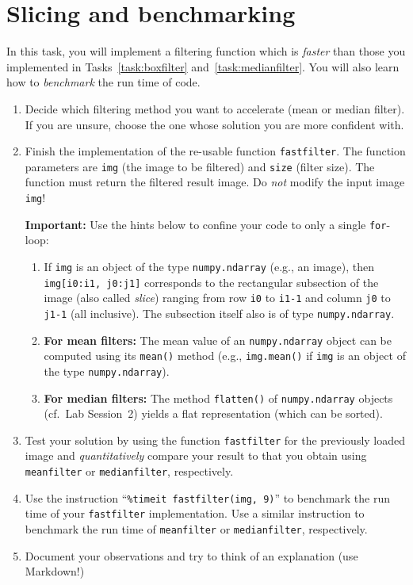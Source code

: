 \documentclass[12pt,a4paper]{article}
\begin{document}
\noindent\begin{minipage}{\textwidth}
\section{Slicing and benchmarking \bonustask}

In this task, you will implement a filtering function which is \emph{faster} than those you implemented in Tasks~\ref{task:boxfilter} and~\ref{task:medianfilter}. You will also learn how to \emph{benchmark} the run time of code.
\begin{enumerate}
    \item Decide which filtering method you want to accelerate (mean or median filter). If you are unsure, choose the one whose solution you are more confident with.
    \item Finish the implementation of the re-usable function \texttt{fastfilter}. The function parameters are \texttt{img} (the image to be filtered) and \texttt{size} (filter size). The function must return the filtered result image. Do \emph{not} modify the input image \texttt{img}! \par\textbf{Important:} Use the hints below to confine your code to only a single \texttt{for}-loop:
    \begin{enumerate}
        \item If \texttt{img} is an object of the type \texttt{numpy.ndarray} (e.g., an image), then \texttt{img[i0:i1, j0:j1]} corresponds to the rectangular subsection of the image (also called \emph{slice}) ranging from row \texttt{i0} to \texttt{i1-1} and column \texttt{j0} to \texttt{j1-1} (all inclusive). The subsection itself also is of type \texttt{numpy.ndarray}.
        \item \textbf{For mean filters:} The mean value of an \texttt{numpy.ndarray} object can be computed using its \texttt{mean()} method (e.g., \texttt{img.mean()} if \texttt{img} is an object of the type \texttt{numpy.ndarray}).
        \item \textbf{For median filters:} The method \texttt{flatten()} of \texttt{numpy.ndarray} objects (cf.\ Lab Session~2) yields a flat representation (which can be sorted).
    \end{enumerate}
    \item Test your solution by using the function \texttt{fastfilter} for the previously loaded image and \emph{quantitatively} compare your result to that you obtain using \texttt{meanfilter} or \texttt{medianfilter}, respectively.
    \item Use the instruction ``\texttt{\%timeit fastfilter(img, 9)}'' to benchmark the run time of your \texttt{fastfilter} implementation. Use a similar instruction to benchmark the run time of \texttt{meanfilter} or \texttt{medianfilter}, respectively.
    \item Document your observations and try to think of an explanation (use Markdown!)
\end{enumerate}
\end{minipage}
\end{document}
